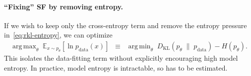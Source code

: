 \documentclass[11pt]{article}
\DeclareMathOperator*{\argmax}{arg\,max}
\DeclareMathOperator*{\argmin}{arg\,min}
\begin{document}
\paragraph{``Fixing'' SF by removing entropy.}
If we wish to keep only the cross-entropy term and remove the entropy
pressure in~\eqref{eq:rkl-entropy}, we can optimize
\begin{align}
\argmax_\theta\;\mathbb{E}_{x\sim p_\theta}\!\left[\ln p_{\text{data}}(x)\right]
\;\;\equiv\;\;
\argmin_\theta\;
D_{\mathrm{KL}}\!\left(p_\theta\;\big\|\;p_{\text{data}}\right)
- H\!\left(p_\theta\right).
\end{align}
This isolates the data-fitting term without explicitly encouraging high
model entropy. In practice, model entropy is intractable, so has to be estimated.
\end{document}

